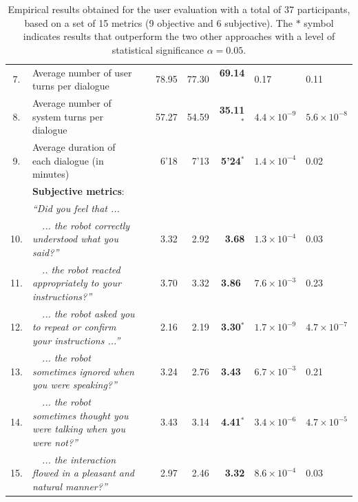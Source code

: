 \begin{table}
\begin{tabular}{|cp{110mm}c|r:r:r|p{16mm}|p{16mm}|}
7.& Average number of user turns per dialogue && 78.95 & 77.30 & \textbf{69.14}$^{\phantom{*}}$ & 0.17 & 0.11 \\ 
8.& Average number of system turns per dialogue && 57.27 & 54.59 & \textbf{35.11}$^{\mathbf{*}}$ & $4.4\!\times\!10^{-9}$ &  $5.6\!\times\!10^{-8}$\\ 
9.& Average duration of each dialogue  (in minutes) \vspace{3mm} && 6'18 & 7'13 &\textbf{ 5'24}$^{\mathbf{*}}$ & $1.4\!\times\!10^{-4}$ & 0.02 \\ \hdashline
& \vspace{-2mm} \textbf{Subjective metrics}:  && & & & & \\ 
&\textit{``Did you feel that ...}  && & & & & \\ 
10.&\ \ \textit{... the robot correctly understood what you said?''}  && 3.32 & 2.92 &  \textbf{3.68} & $1.3\!\times\!10^{-4}$ & 0.03 \\
11.& \ \ \textit{.. the robot reacted appropriately to your instructions?''}   && 3.70 & 3.32 & \textbf{3.86}$^{\phantom{*}}$ & $7.6\!\times\!10^{-3}$ & 0.23 \\
12.&\ \ \textit{... the robot asked you to repeat or confirm your instructions ...''}   & & 2.16 & 2.19 & \textbf{3.30}$^{\mathbf{*}}$ & $1.7\!\times\!10^{-9}$ & $4.7\!\times\!10^{-7}$ \\
13.&\ \ \textit{... the robot sometimes ignored when you were speaking?''}  & & 3.24 & 2.76 & \textbf{3.43}$^{\phantom{*}}$ & $6.7\!\times\!10^{-3}$ & 0.21 \\
14.&\ \ \textit{... the robot sometimes thought you were talking when you were not?''}  & & 3.43 & 3.14 & \textbf{4.41}$^{\mathbf{*}}$ & $3.4\!\times\!10^{-6}$ & $4.7\!\times\!10^{-5}$ \\
15.&\ \ \textit{... the interaction flowed in a pleasant and natural manner?''} \vspace{3mm}  & & 2.97 & 2.46 & \textbf{3.32} & $8.6\!\times\!10^{-4}$ & 0.03 \\ \hline
\end{tabular} \vspace{3mm}
\label{table:results_exp3}
\caption{Empirical results obtained for the user evaluation with a total of 37 participants, based on a set of 15 metrics (9 objective and 6 subjective). The $\mathbf{*}$ symbol indicates results that outperform the two other approaches with a level of statistical significance $\alpha = 0.05$. }
\end{table}

